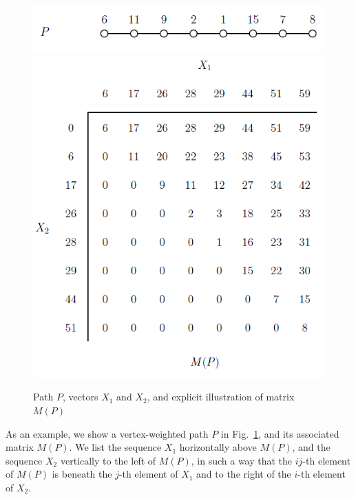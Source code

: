 \begin{figure}[thb]
\begin{center}
\includegraphics{fig2p1a}
\includegraphics{fig2p1b}
\end{center}
\caption{\small Path $P$, vectors $X_1$ and $X_2$, and explicit illustration of matrix $M(P)$
\label{fig1}}
\end{figure}

As an example, we show a vertex-weighted path $P$ in Fig.~\ref{fig1},
and its associated matrix $M(P)$.
We list the sequence $X_1$ horizontally above $M(P)$,
and the sequence $X_2$ vertically to the left of $M(P)$,
in such a way that the $ij$-th element of $M(P)$
is beneath the $j$-th element of $X_1$
and to the right of the $i$-th element of $X_2$.

